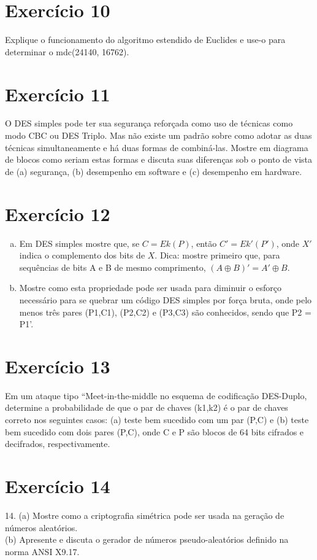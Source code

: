\documentclass[10pt,a4paper]{article}
\begin{document}
\section*{Exercício 10}
Explique o funcionamento do algoritmo estendido de Euclides e use-o para determinar o mdc(24140, 16762).
\section*{Exercício 11}
O DES simples pode ter sua segurança reforçada como uso de técnicas como modo CBC ou DES Triplo. Mas não existe um padrão sobre como adotar as duas técnicas simultaneamente e há duas formas de combiná-las. Mostre em diagrama de blocos como seriam estas formas e discuta suas diferenças sob o ponto de vista de (a) segurança, (b) desempenho em software e (c) desempenho em hardware.\\
\section*{Exercício 12}
\begin{enumerate}[(a)]
\item Em DES simples mostre que, se $C=Ek(P)$, então $C'=Ek'(P')$, onde $X'$ indica o complemento dos bits de $X$. Dica: mostre primeiro que, para sequências de bits A e B de mesmo comprimento, $(A \oplus B)' = A' \oplus B$.
\item Mostre como esta propriedade pode ser usada para diminuir o esforço necessário para se quebrar um código DES simples por força bruta, onde pelo menos três pares (P1,C1), (P2,C2) e (P3,C3) são conhecidos, sendo que P2 = P1'.
\end{enumerate}
\section*{Exercício 13}
Em um ataque tipo ``Meet-in-the-middle no esquema de codificação DES-Duplo, determine a probabilidade de que o par de chaves (k1,k2) é o par de chaves correto nos seguintes casos: (a) teste bem sucedido com um par (P,C) e (b) teste bem sucedido com dois pares (P,C), onde C e P são blocos de 64 bits cifrados e decifrados, respectivamente.\\
\section*{Exercício 14}
14. (a) Mostre como a criptografia simétrica pode ser usada na geração de números aleatórios.\\
(b) Apresente e discuta o gerador de números pseudo-aleatórios definido na norma ANSI X9.17.\\
\end{document}
